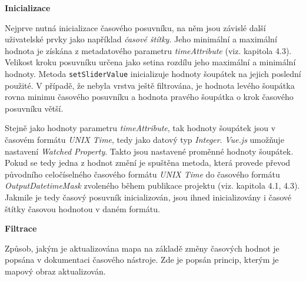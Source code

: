\bigskip
\noindent \textbf{Inicializace}

Nejprve nutná inicializace časového posuvníku, na něm jsou závislé
další uživatelské prvky jako například \textit{časové štítky}. Jeho
minimální a maximální hodnota je získána z metadatového
parametru \textit{timeAttribute} (viz. kapitola 4.3). Velikost kroku
posuvníku určena jako setina rozdílu jeho maximální a minimální
hodnoty. Metoda \verb|setSliderValue| inicializuje hodnoty šoupátek na
jejich poslední použité. V případě, že nebyla vrstva ještě filtrována,
je hodnota levého šoupátka rovna minimu časového posuvníku a hodnota
pravého šoupátka o krok časového posuvníku větší.

Stejně jako hodnoty parametru \textit{timeAttribute}, tak hodnoty
šoupátek jsou v časovém formátu \textit{UNIX Time}, tedy jako datový
typ \textit{Integer}. \textit{Vue.js} umožňuje
nastavení \textit{Watched Property}. Takto jsou nastavené proměnné
hodnoty šoupátek. Pokud se tedy jedna z hodnot změní je spuštěna
metoda, která provede převod původního celočíselného časového
formátu \textit{UNIX Time} do časového
formátu \textit{OutputDatetimeMask} zvoleného během publikace projektu
(viz. kapitola 4.1, 4.3). Jakmile je tedy časový posuvník
inicializován, jsou ihned inicializovány i časové štítky časovou
hodnotou v daném formátu.

\bigskip
\noindent \textbf{Filtrace}


Způsob, jakým je aktualizována mapa na základě změny časových hodnot
je popsána v dokumentaci časového nástroje. Zde je popsán princip,
kterým je mapový obraz aktualizován.

